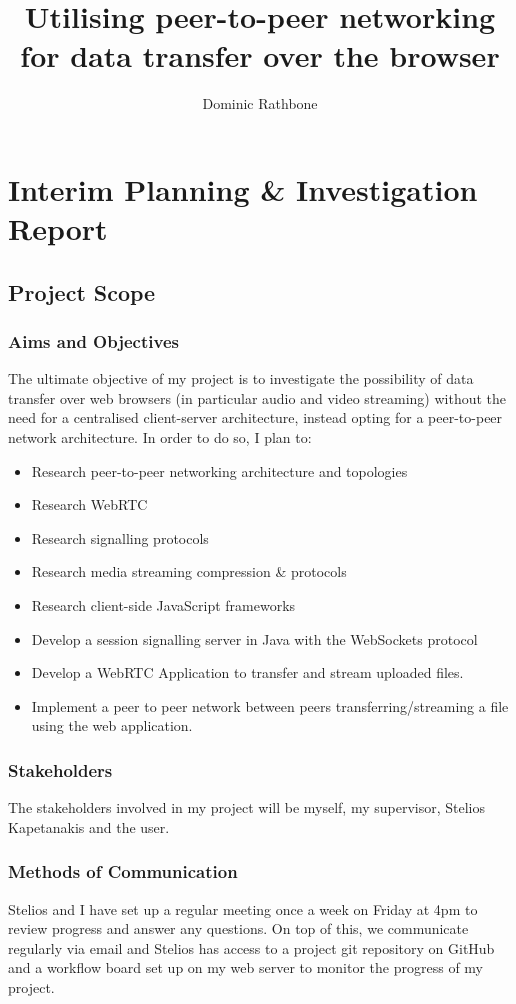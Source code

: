 \documentclass[]{report}
\title{Utilising peer-to-peer networking for data transfer over the browser}
\author{Dominic Rathbone}
\begin{document}
\maketitle
\tableofcontents
\listoftodos

\chapter{Interim Planning \& Investigation Report}
	\section{Project Scope}
		\subsection*{Aims and Objectives}
			The ultimate objective of my project is to investigate the possibility of data transfer over web browsers (in particular audio and video streaming) without the need for a centralised client-server architecture, instead opting for a peer-to-peer network architecture. In order to do so, I plan to:
			\begin{itemize}
				\item Research peer-to-peer networking architecture and topologies
				\item Research WebRTC
				\item Research signalling protocols
				\item Research media streaming compression \& protocols
				\item Research client-side JavaScript frameworks
				\item Develop a session signalling server in Java with the WebSockets protocol
				\item Develop a WebRTC Application to transfer and stream uploaded files.
				\item Implement a peer to peer network between peers transferring/streaming a file using the web application.
			\end{itemize}
		\subsection*{Stakeholders}
			The stakeholders involved in my project will be myself, my supervisor, Stelios Kapetanakis and the user.
		\subsection*{Methods of Communication}
			Stelios and I have set up a regular meeting once a week on Friday at 4pm to review progress and answer any questions. On top of this, we communicate regularly via email and Stelios has access to a project git repository on GitHub and a workflow board set up on my web server to monitor the progress of my project. 
			
\end{document}
